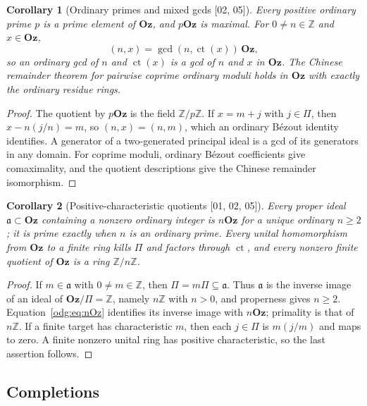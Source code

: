 \documentclass[11pt,oneside]{article}
\numberwithin{equation}{section}
\newtheorem{corollary}[corollary]{Corollary}
\theoremstyle{definition}
\theoremstyle{remark}
\newcommand{\Oz}{\mathbf{Oz}}
\newcommand{\Z}{\mathbb Z}
\newcommand{\ct}{\operatorname{ct}}
\newcommand{\src}[1]{\textup{\textsf{\small[#1]}}}
\begin{document}
\begin{corollary}[Ordinary primes and mixed gcds \src{02, 05}]\label{odg:cor:mixedgcd}
Every positive ordinary prime $p$ is a prime element of $\Oz$, and $p\Oz$ is
maximal. For $0\ne n\in\Z$ and $x\in\Oz$,
\[
 (n,x)=\gcd(n,\ct(x))\,\Oz,
\]
so an ordinary gcd of $n$ and $\ct(x)$ is a gcd of $n$ and $x$ in $\Oz$. The
Chinese remainder theorem for pairwise coprime ordinary moduli holds in $\Oz$
with exactly the ordinary residue rings.
\end{corollary}
\begin{proof}
The quotient by $p\Oz$ is the field $\Z/p\Z$. If $x=m+j$ with $j\in\Pi$,
then $x-n(j/n)=m$, so $(n,x)=(n,m)$, which an ordinary B\'ezout identity
identifies. A generator of a two-generated principal ideal is a gcd of its
generators in any domain. For coprime moduli, ordinary B\'ezout coefficients
give comaximality, and the quotient descriptions give the Chinese remainder
isomorphism.
\end{proof}

\begin{corollary}[Positive-characteristic quotients \src{01, 02, 05}]\label{odg:cor:charideals}
Every proper ideal $\mathfrak a\subset\Oz$ containing a nonzero ordinary
integer is $n\Oz$ for a unique ordinary $n\geq2$; it is prime exactly when
$n$ is an ordinary prime. Every unital homomorphism from $\Oz$ to a finite
ring kills $\Pi$ and factors through $\ct$, and every nonzero finite quotient
of $\Oz$ is a ring $\Z/n\Z$.
\end{corollary}
\begin{proof}
If $m\in\mathfrak a$ with $0\ne m\in\Z$, then $\Pi=m\Pi\subseteq\mathfrak a$.
Thus $\mathfrak a$ is the inverse image of an ideal of $\Oz/\Pi=\Z$, namely
$n\Z$ with $n>0$, and properness gives $n\geq2$. Equation~\eqref{odg:eq:nOz}
identifies its inverse image with $n\Oz$; primality is that of $n\Z$. If a
finite target has characteristic $m$, then each $j\in\Pi$ is $m(j/m)$ and
maps to zero. A finite nonzero unital ring has positive characteristic, so the
last assertion follows.
\end{proof}

\subsection{Completions}
\end{document}
